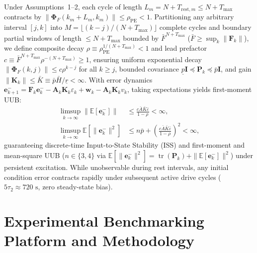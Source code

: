 \documentclass[balance,nocopyright,upint,varvw,hyphenate,barcolor=NavyBlue,nolists]{asmejour}
\begin{document}
Under Assumptions~1--2, each cycle of length $L_m = N + T_{\text{rest},m} \le N + T_{\max}$ contracts by $\|\boldsymbol{\Phi}_F(k_m+L_m, k_m)\| \le \rho_{\text{PE}} < 1$. Partitioning any arbitrary interval $[j, k]$ into $M = \lfloor (k-j)/(N+T_{\max}) \rfloor$ complete cycles and boundary partial windows of length $\le N+T_{\max}$ bounded by $\bar{F}^{N+T_{\max}}$ ($\bar{F} \ge \sup_k \|\mathbf{F}_k\|$), we define composite decay $\rho \equiv \rho_{\text{PE}}^{1/(N+T_{\max})} < 1$ and lead prefactor $c \equiv \bar{F}^{N+T_{\max}} \rho^{-(N+T_{\max})} \ge 1$, ensuring uniform exponential decay $\|\boldsymbol{\Phi}_F(k, j)\| \le c \rho^{k-j}$ for all $k \ge j$, bounded covariance $\underline{p}\mathbf{I} \preceq \mathbf{P}_k \preceq \bar{p}\mathbf{I}$, and gain $\|\mathbf{K}_k\| \le \bar{K} \equiv \bar{p}\bar{H}/\underline{r} < \infty$. With error dynamics $\mathbf{e}_{k+1}^- = \mathbf{F}_k \mathbf{e}_k^- - \mathbf{A}_k \mathbf{K}_k \varepsilon_k + \mathbf{w}_k - \mathbf{A}_k \mathbf{K}_k v_k$, taking expectations yields first-moment UUB:
\begin{align}
\limsup_{k \to \infty} \|\mathbb{E}[\mathbf{e}_k^-]\| &\le \frac{c \bar{A} \bar{K} \bar{\varepsilon}}{1 - \rho} < \infty, \label{eqn:bibs_pidkf}\\
\limsup_{k \to \infty} \mathbb{E}[\|\mathbf{e}_k^-\|^2] &\le n\bar{p} + \left(\frac{c \bar{A} \bar{K} \bar{\varepsilon}}{1 - \rho}\right)^2 < \infty, \label{eqn:ms_pidkf}
\end{align}
guaranteeing discrete-time Input-to-State Stability (ISS) and first-moment and mean-square UUB ($n \in \{3, 4\}$ via $\mathbb{E}[\|\mathbf{e}_k^-\|^2] = \operatorname{tr}(\mathbf{P}_k) + \|\mathbb{E}[\mathbf{e}_k^-]\|^2$) under persistent excitation. While unobservable during rest intervals, any initial condition error contracts rapidly under subsequent active drive cycles ($5\tau_2 \approx 720\text{ s}$, zero steady-state bias).
\section{Experimental Benchmarking Platform and Methodology\label{sec:exp_setup}}
\end{document}
